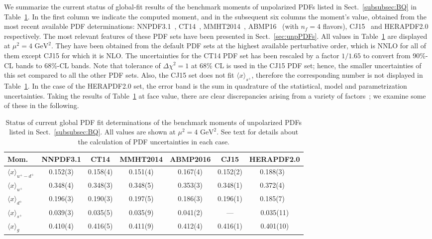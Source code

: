 We summarize the current status of global-fit results of the benchmark
moments of unpolarized PDFs listed in Sect.~\ref{subsubsec:BQ} 
in Table~\ref{tab:unpPDFmoms}.
%
In the first column we indicate the computed moment, and in the subsequent 
six columns the moment's value, obtained from the most recent available PDF 
determinations: NNPDF3.1~\cite{Ball:2017nwa},
CT14~\cite{Dulat:2015mca}, MMHT2014~\cite{Harland-Lang:2014zoa},
ABMP16~\cite{Alekhin:2017kpj} (with $n_f=4$ flavors), 
CJ15~\cite{Accardi:2016qay} and 
HERAPDF2.0~\cite{Abramowicz:2015mha} respectively.
%
The most relevant features of these PDF sets have been presented in 
Sect.~\ref{sec:unpPDFs}.
%
All values in Table~\ref{tab:unpPDFmoms} are displayed
at $\mu^2=4\mbox{ GeV}^2$. 
%
They have been obtained from the default PDF sets at the highest available 
perturbative order, which is NNLO for all of them except CJ15
for which it is NLO.
%
The uncertainties for the CT14 PDF set has been rescaled by a factor $1/1.65$ 
to convert from  90\%-CL bands to  68\%-CL bands.
%
Note that tolerance of $\Delta \chi^2=1$ at 68\% CL is used in the CJ15 PDF 
set; hence, the smaller uncertainties of this set compared to all the other 
PDF sets.
%
Also, the CJ15 set does  not fit $\langle x \rangle_{s^+}$, therefore the 
corresponding number is not displayed in Table~\ref{tab:unpPDFmoms}. 
%
In the case of the HERAPDF2.0 set, the error band is the sum in quadrature 
of the statistical, model and parametrization uncertainties.
%
Taking the results of Table~\ref{tab:unpPDFmoms} at face value,
there are clear discrepancies arising from a variety of 
factors~\cite{Butterworth:2015oua,Accardi:2016ndt};
we examine some of these in the following. 

\begin{table}[!t]
\centering
\renewcommand{\arraystretch}{1.2}
\begin{tabular}{lcccccc}
\toprule
Mom. 
& NNPDF3.1 & CT14 & MMHT2014 & ABMP2016 & CJ15 & HERAPDF2.0 \\
\midrule
$\langle x \rangle_{u^+-d^+}$ 
& 0.152(3) & 0.158(4) & 0.151(4) & 0.167(4) & 0.152(2) & 0.188(3)\ \,\\
$\langle x \rangle_{u^+}$    
& 0.348(4) & 0.348(3) & 0.348(5) & 0.353(3) & 0.348(1) & 0.372(4)\ \,\\
$\langle x \rangle_{d^+}$    
& 0.196(3) & 0.190(3) & 0.197(5) & 0.186(3) & 0.196(1) & 0.185(7)\ \,\\
$\langle x \rangle_{s^+}$    
& 0.039(3) & 0.035(5) & 0.035(9) & 0.041(2) & ---   & 0.035(11)\\
$\langle x \rangle_{g}$     
& 0.410(4) & 0.416(5) & 0.411(9) & 0.412(4) & 0.416(1) & 0.401(10)\\
\bottomrule
\end{tabular}
\caption{\small Status of current global PDF fit determinations of the 
benchmark moments of unpolarized PDFs listed in Sect.~\ref{subsubsec:BQ}.
All values are shown at $\mu^2=4\mbox{ GeV}^2$.
%
See text for details about the calculation of PDF uncertainties in each case.
}
\label{tab:unpPDFmoms}
\end{table}

